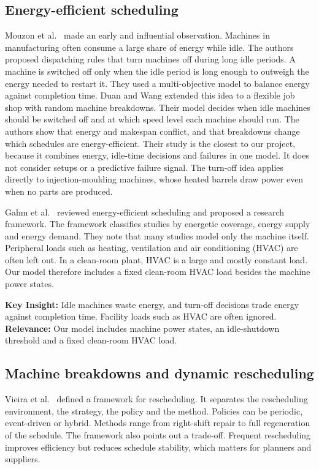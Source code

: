 \documentclass[11pt,a4paper]{article}
\begin{document}
\subsection{Energy-efficient scheduling}
Mouzon et al.\ \cite{mouzon2007} made an early and influential observation. Machines in manufacturing often consume a large share of energy while idle. The authors proposed dispatching rules that turn machines off during long idle periods. A machine is switched off only when the idle period is long enough to outweigh the energy needed to restart it. They used a multi-objective model to balance energy against completion time. Duan and Wang \cite{duan2021} extended this idea to a flexible job shop with random machine breakdowns. Their model decides when idle machines should be switched off and at which speed level each machine should run. The authors show that energy and makespan conflict, and that breakdowns change which schedules are energy-efficient. Their study is the closest to our project, because it combines energy, idle-time decisions and failures in one model. It does not consider setups or a predictive failure signal. The turn-off idea applies directly to injection-moulding machines, whose heated barrels draw power even when no parts are produced.

Gahm et al.\ \cite{gahm2016} reviewed energy-efficient scheduling and proposed a research framework. The framework classifies studies by energetic coverage, energy supply and energy demand. They note that many studies model only the machine itself. Peripheral loads such as heating, ventilation and air conditioning (HVAC) are often left out. In a clean-room plant, HVAC is a large and mostly constant load. Our model therefore includes a fixed clean-room HVAC load besides the machine power states.

\textbf{Key Insight:} Idle machines waste energy, and turn-off decisions trade energy against completion time. Facility loads such as HVAC are often ignored.\\
\textbf{Relevance:} Our model includes machine power states, an idle-shutdown threshold and a fixed clean-room HVAC load.

\subsection{Machine breakdowns and dynamic rescheduling}
Vieira et al.\ \cite{vieira2003} defined a framework for rescheduling. It separates the rescheduling environment, the strategy, the policy and the method. Policies can be periodic, event-driven or hybrid. Methods range from right-shift repair to full regeneration of the schedule. The framework also points out a trade-off. Frequent rescheduling improves efficiency but reduces schedule stability, which matters for planners and suppliers.
\end{document}

